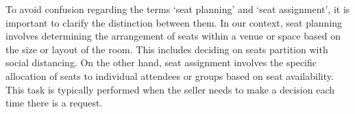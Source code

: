 To avoid confusion regarding the terms `seat planning' and `seat assignment', it is important to clarify the distinction between them. In our context, seat planning involves determining the arrangement of seats within a venue or space based on the size or layout of the room. This includes deciding on seats partition with social distancing. On the other hand, seat assignment involves the specific allocation of seats to individual attendees or groups based on seat availability. This task is typically performed when the seller needs to make a decision each time there is a request.








